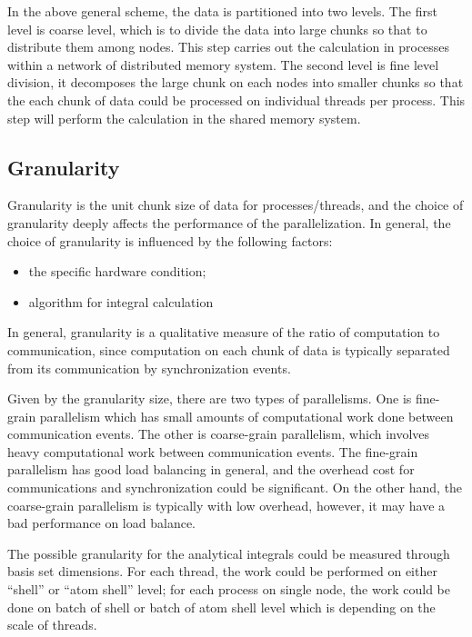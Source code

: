 In the above general scheme, the data is partitioned into two levels. The first
level is coarse level, which is to divide the data into large chunks so that 
to distribute them among nodes. This step carries out the calculation in
processes within a network of distributed memory system. The second level is 
fine level division, it decomposes the large chunk on each nodes into smaller 
chunks so that the each chunk of data could be processed on individual threads 
per process. This step will perform the calculation in the shared memory system.

\subsection{Granularity}

Granularity is the unit chunk size of data for processes/threads, and the 
choice of granularity deeply affects the performance of the parallelization. 
In general, the choice of granularity is influenced by the following factors:
\begin{itemize}
 \item the specific hardware condition;
 \item algorithm for integral calculation
\end{itemize}

In general, granularity is a qualitative measure of the ratio of computation 
to communication, since computation on each chunk of data is typically separated 
from its communication by synchronization events.

Given by the granularity size, there are two types of parallelisms. One is 
fine-grain parallelism which has small amounts of computational work done 
between communication events. The other is coarse-grain parallelism, which
involves heavy computational work between communication events. The fine-grain
parallelism has good load balancing in general, and the overhead cost for 
communications and synchronization could be significant. On the other hand,
the coarse-grain parallelism is typically with low overhead, however, it may
have a bad performance on load balance. 

The possible granularity for the analytical integrals could be measured through
basis set dimensions. For each thread, the work could be performed on either
``shell'' or ``atom shell'' level; for each process on single node, the work could 
be done on batch of shell or batch of atom shell level which is depending on
the scale of threads.

